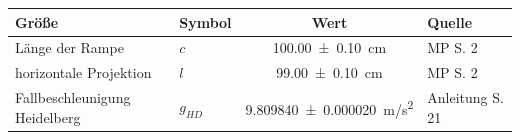 \begin{tabular}{llcl}
\hline
Größe & Symbol & Wert & Quelle \\
\hline
Länge der Rampe & $c$ & \qty{100.00 \pm 0.10}{cm} & MP S. 2 \\
horizontale Projektion & $l$ & \qty{99.00 \pm 0.10}{cm} & MP S. 2 \\
Fallbeschleunigung Heidelberg & $g_{HD}$ & \qty{9.809840 \pm 0.000020}{m/s^2} & Anleitung S. 21 \\
\hline
\end{tabular}
